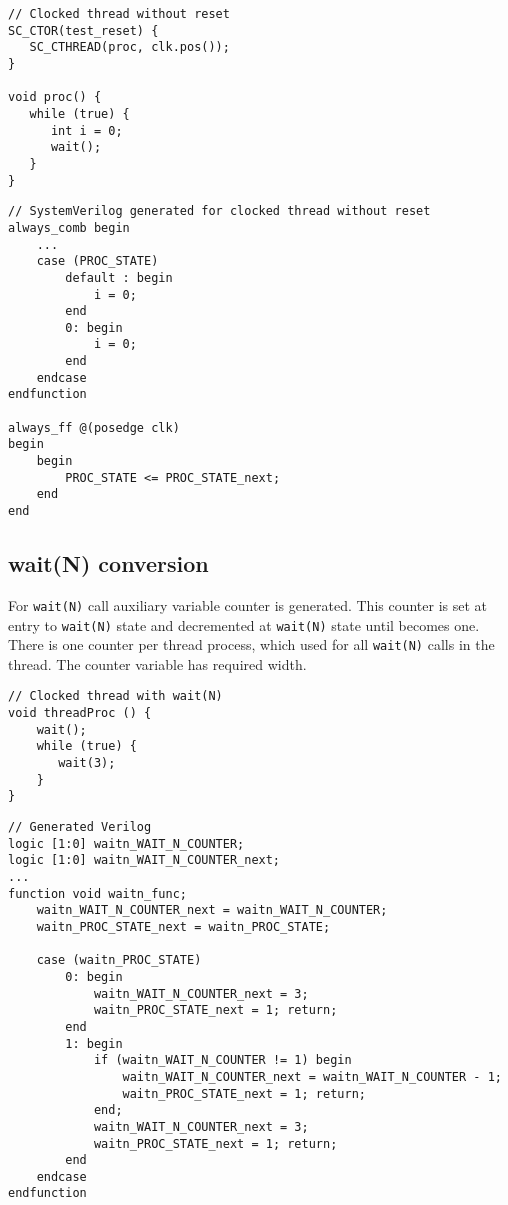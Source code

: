\begin{lstlisting}[style=mycpp]
// Clocked thread without reset
SC_CTOR(test_reset) {
   SC_CTHREAD(proc, clk.pos());
}

void proc() {
   while (true) {
      int i = 0;
      wait();
   }
}
\end{lstlisting}
%
\begin{lstlisting}[style=myverilog]
// SystemVerilog generated for clocked thread without reset
always_comb begin 
    ...
    case (PROC_STATE)
        default : begin
            i = 0;
        end
        0: begin
            i = 0;
        end
    endcase
endfunction

always_ff @(posedge clk) 
begin 
    begin
        PROC_STATE <= PROC_STATE_next;
    end
end
\end{lstlisting}

\subsection{wait(N) conversion}\label{section:waitn_gen}

For {\tt wait(N)} call auxiliary variable counter is generated. This counter is set at entry to {\tt wait(N)} state and decremented at {\tt wait(N)} state until becomes one.
There is one counter per thread process, which used for all {\tt wait(N)} calls in the thread. The counter variable has required width.

\begin{lstlisting}[style=mycpp]
// Clocked thread with wait(N)
void threadProc () {
    wait();
    while (true) {
       wait(3);
    }
}
\end{lstlisting}
%
\begin{lstlisting}[style=myverilog]
// Generated Verilog
logic [1:0] waitn_WAIT_N_COUNTER;
logic [1:0] waitn_WAIT_N_COUNTER_next;
...
function void waitn_func;
    waitn_WAIT_N_COUNTER_next = waitn_WAIT_N_COUNTER;
    waitn_PROC_STATE_next = waitn_PROC_STATE;
    
    case (waitn_PROC_STATE)
        0: begin
            waitn_WAIT_N_COUNTER_next = 3;
            waitn_PROC_STATE_next = 1; return;    
        end
        1: begin
            if (waitn_WAIT_N_COUNTER != 1) begin
                waitn_WAIT_N_COUNTER_next = waitn_WAIT_N_COUNTER - 1;
                waitn_PROC_STATE_next = 1; return;    
            end;
            waitn_WAIT_N_COUNTER_next = 3;
            waitn_PROC_STATE_next = 1; return;    
        end
    endcase
endfunction
\end{lstlisting}

